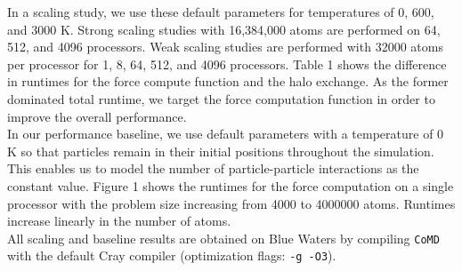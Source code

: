\documentclass[12pt]{article}
\begin{document}
\noindent In a scaling study, we use these default parameters for temperatures of 
0, 600, and 3000 K. Strong scaling studies with 16,384,000 atoms are
performed on 64, 512, and 4096 processors. Weak scaling studies are
performed with 32000 atoms per processor for 1, 8, 64, 512, and 4096 
processors. Table 1 shows the difference in runtimes for the force compute
function and the halo exchange. As the former dominated total runtime, 
we target the force computation function in order to improve the overall 
performance. \\

\noindent In our performance baseline, we use default parameters with a temperature of 
0 K so that particles remain in their initial positions throughout the simulation.
This enables us to model the number of particle-particle interactions as the 
constant value. Figure 1 shows the runtimes for the force computation on 
a single processor with the problem size increasing from 4000 to 4000000 
atoms. Runtimes increase linearly in the number of atoms. \\

\noindent All scaling and baseline results are obtained on Blue Waters by compiling 
\texttt{CoMD} with the default Cray compiler (optimization flags: \texttt{-g -O3}).
\end{document}
